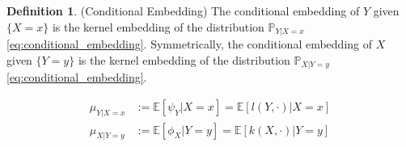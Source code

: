\documentclass[twoside]{article} \usepackage{aistats2017}
\theoremstyle{definition}
\newtheorem{definition}[theorem]{Definition}
\newcommand{\rv}[1]{{#1}}
\newcommand{\expect}[1]{{\mathbb{E}[#1]}}
\newcommand{\muYx}{\mu_{\rv{Y} | \rv{X} = x}}
\newcommand{\muXy}{\mu_{\rv{X} | \rv{Y} = y}}
\newcommand{\phiX}{\phi_{\rv{X}}}
\newcommand{\psiY}{\psi_{\rv{Y}}}
\begin{document}
		\begin{definition} \label{def:conditional_embedding}
			(Conditional Embedding)
			The conditional embedding of $\rv{Y}$ given $\{\rv{X} = x\}$ is the kernel embedding of the distribution $\mathbb{P}_{\rv{Y} | \rv{X} = x}$ \eqref{eq:conditional_embedding}. Symmetrically, the conditional embedding of $\rv{X}$ given $\{\rv{Y} = y\}$ is the kernel embedding of the distribution $\mathbb{P}_{\rv{X} | \rv{Y} = y}$ \eqref{eq:conditional_embedding}.
			
			\begin{equation}
			\begin{aligned}
				\muYx &:= \expect{\psiY | \rv{X} = x} = \expect{l(\rv{Y}, \cdot) | \rv{X} = x} \\
				\muXy &:= \expect{\phiX | \rv{Y} = y} = \expect{k(\rv{X}, \cdot) | \rv{Y} = y}
			\label{eq:conditional_embedding}
			\end{aligned}
			\end{equation}
		\end{definition}
		
\end{document}
